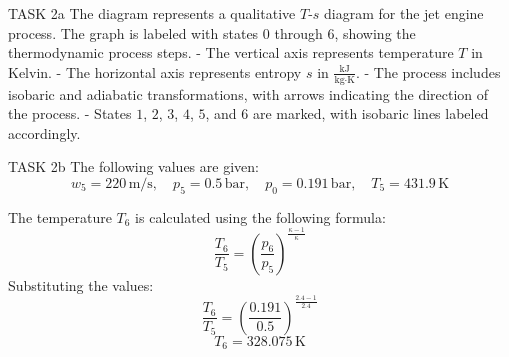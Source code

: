 TASK 2a  
The diagram represents a qualitative \( T \)-\( s \) diagram for the jet engine process. The graph is labeled with states \( 0 \) through \( 6 \), showing the thermodynamic process steps.  
- The vertical axis represents temperature \( T \) in Kelvin.  
- The horizontal axis represents entropy \( s \) in \( \frac{\text{kJ}}{\text{kg·K}} \).  
- The process includes isobaric and adiabatic transformations, with arrows indicating the direction of the process.  
- States \( 1 \), \( 2 \), \( 3 \), \( 4 \), \( 5 \), and \( 6 \) are marked, with isobaric lines labeled accordingly.  

TASK 2b  
The following values are given:  
\[
w_5 = 220 \, \text{m/s}, \quad p_5 = 0.5 \, \text{bar}, \quad p_0 = 0.191 \, \text{bar}, \quad T_5 = 431.9 \, \text{K}
\]  

The temperature \( T_6 \) is calculated using the following formula:  
\[
\frac{T_6}{T_5} = \left( \frac{p_6}{p_5} \right)^{\frac{\kappa - 1}{\kappa}}
\]  
Substituting the values:  
\[
\frac{T_6}{T_5} = \left( \frac{0.191}{0.5} \right)^{\frac{2.4 - 1}{2.4}}
\]  
\[
T_6 = 328.075 \, \text{K}
\]